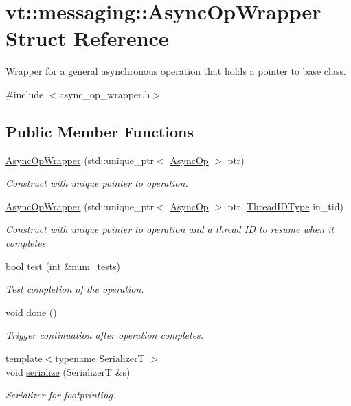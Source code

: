 \hypertarget{structvt_1_1messaging_1_1_async_op_wrapper}{}\section{vt\+:\+:messaging\+:\+:Async\+Op\+Wrapper Struct Reference}
\label{structvt_1_1messaging_1_1_async_op_wrapper}


Wrapper for a general asynchronous operation that holds a pointer to base class.  




{\ttfamily \#include $<$async\+\_\+op\+\_\+wrapper.\+h$>$}

\subsection*{Public Member Functions}
\begin{DoxyCompactItemize}
\item 
\hyperlink{structvt_1_1messaging_1_1_async_op_wrapper_a06c7dd199e7b2c252e23c8d81950feed}{Async\+Op\+Wrapper} (std\+::unique\+\_\+ptr$<$ \hyperlink{structvt_1_1messaging_1_1_async_op}{Async\+Op} $>$ ptr)
\begin{DoxyCompactList}\small\item\em Construct with unique pointer to operation. \end{DoxyCompactList}\item 
\hyperlink{structvt_1_1messaging_1_1_async_op_wrapper_a0f24b66147eac512eefec8f5f86dd5ac}{Async\+Op\+Wrapper} (std\+::unique\+\_\+ptr$<$ \hyperlink{structvt_1_1messaging_1_1_async_op}{Async\+Op} $>$ ptr, \hyperlink{namespacevt_a9b887d814dd25ff495a0c8270304ac02}{Thread\+I\+D\+Type} in\+\_\+tid)
\begin{DoxyCompactList}\small\item\em Construct with unique pointer to operation and a thread ID to resume when it completes. \end{DoxyCompactList}\item 
bool \hyperlink{structvt_1_1messaging_1_1_async_op_wrapper_a09ca2119c78c9b3663ad6a3708d3a3c7}{test} (int \&num\+\_\+tests)
\begin{DoxyCompactList}\small\item\em Test completion of the operation. \end{DoxyCompactList}\item 
void \hyperlink{structvt_1_1messaging_1_1_async_op_wrapper_afe1b0def9a79849baa18373787440714}{done} ()
\begin{DoxyCompactList}\small\item\em Trigger continuation after operation completes. \end{DoxyCompactList}\item 
{\footnotesize template$<$typename SerializerT $>$ }\\void \hyperlink{structvt_1_1messaging_1_1_async_op_wrapper_a219a6d0d317bd75c0d559dbb91838166}{serialize} (SerializerT \&s)
\begin{DoxyCompactList}\small\item\em Serializer for footprinting. \end{DoxyCompactList}\end{DoxyCompactItemize}
